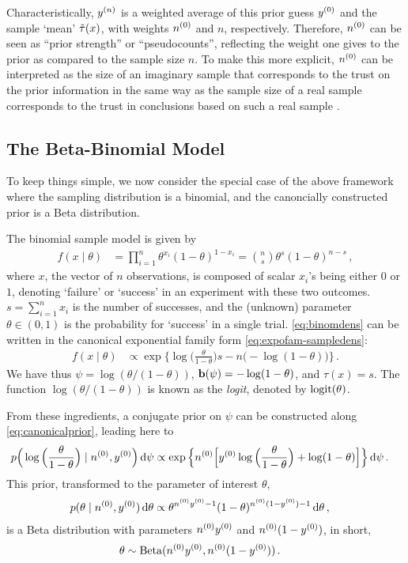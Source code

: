 Characteristically, $y^{(n)}$ is a weighted average of this prior guess $y^{(0)}$ and the sample `mean' $\tilde{\tau}(x)$,
with weights $n^{(0)}$ and $n$, respectively.
Therefore, $n^{(0)}$ can be seen as ``prior strength'' or ``pseudocounts'',
reflecting the weight one gives to the prior as compared to the sample size $n$.
To make this more explicit, $n^{(0)}$ can be interpreted as the size of an imaginary sample
that corresponds to the trust on the prior information in the same way
as the sample size of a real sample
corresponds to the trust in conclusions based on such a real sample
\cite[p.~258]{Walter2009a-long}.


\subsection{The Beta-Binomial Model}
\label{sec:beta-binom}

To keep things simple, we now consider the special case of the above framework
where the sampling distribution is a binomial, and the canoncially constructed prior is a Beta distribution.

The binomial sample model is given by
\begin{align}
\label{eq:binomdens}
f(x\mid\theta) &= \prod_{i=1}^n \theta^{x_i} (1-\theta)^{1-x_i} = {n \choose s}\theta^s (1-\theta)^{n-s}\,,
\end{align}
where $x$, the vector of $n$ observations, is composed of scalar $x_i$'s being either $0$ or $1$,
denoting `failure' or `success' in an experiment with these two outcomes.
$s = \sum_{i=1}^n x_i$ is the number of successes,
and the (unknown) parameter $\theta \in (0,1)$ is the probability for `success' in a single trial.
\eqref{eq:binomdens} can be written in the canonical exponential family form \eqref{eq:expofam-sampledens}:
\begin{align*}
f(x\mid\theta) &\propto \exp\Big\{ \log\Big(\frac{\theta}{1-\theta}\Big) s - n \big(-\log(1-\theta)\big) \Big\} \,.
\end{align*}
We have thus $\psi = \log(\theta/(1-\theta))$, $\mathbf{b}(\psi) = -\log(1-\theta)$, and $\tau(x) = s$.
The function $\log(\theta/(1-\theta))$ is known as the \emph{logit}, denoted by $\operatorname{logit}(\theta)$.

From these ingredients, a conjugate prior on $\psi$ can be constructed along \eqref{eq:canonicalprior},
leading here to
\begin{align*}
p\Big(\log\Big(\frac{\theta}{1-\theta}\Big) \mid \nz, \yz\Big) \dd\psi %
 &\propto \exp\Big\{ \nz \Big[ \yz \log\Big(\frac{\theta}{1-\theta}\Big) + \log(1-\theta) \Big] \Big\} \dd\psi\,.
\end{align*}
This prior, transformed to the parameter of interest $\theta$,
\begin{align*}
p(\theta\mid n^{(0)}, y^{(0)})\,\mathrm{d}\theta &\propto \theta^{n^{(0)}y^{(0)} - 1} (1-\theta)^{n^{(0)}(1-y^{(0)}) - 1} \,\mathrm{d}\theta\,,
\end{align*}
is a Beta distribution with parameters $n^{(0)}y^{(0)}$ and $n^{(0)}(1-y^{(0)})$, in short, %
\begin{align*}
\theta &\sim \operatorname{Beta}(n^{(0)}y^{(0)}, n^{(0)}(1-y^{(0)}))\,.
\end{align*}

